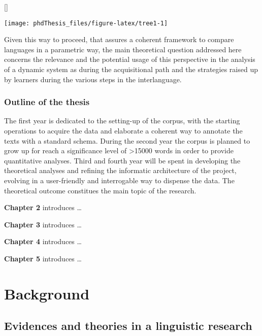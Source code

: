 \documentclass[
  a4paper,
  twoside,
  12pt,
  chapterprefix=false,
  bibliography=totocnumbered,
  listof=flat]{scrbook}
\makeatletter
\renewenvironment{figure}[1][\fps@figure]{
  \edef\@tempa{\noexpand\@float{figure}[#1]} 
  \@tempa
  \sffamily
}{
  \end@float
}
\makeatother
\begin{document}
\begin{figure}

{\centering \texttt{[image: phdThesis\_files/figure-latex/tree1-1]} 

}

\caption{Structural representation of a simple sentence}\label{fig:tree1}
\end{figure}

Given this way to proceed, that assures a coherent framework to compare languages in a parametric way, the main theoretical question addressed here concerns the relevance and the potential usage of this perspective in the analysis of a dynamic system as during the acquisitional path and the strategies raised up by learners during the various steps in the interlanguage.

\hypertarget{outline-of-the-thesis}{%
\section{Outline of the thesis}\label{outline-of-the-thesis}}

The first year is dedicated to the setting-up of the corpus, with the starting operations to acquire the data and elaborate a coherent way to annotate the texts with a standard schema. During the second year the corpus is planned to grow up for reach a significance level of \textgreater15000 words in order to provide quantitative analyses.
Third and fourth year will be spent in developing the theoretical analyses and refining the informatic architecture of the project, evolving in a user-friendly and interrogable way to dispense the data. The theoretical outcome constitues the main topic of the research.

\textbf{Chapter 2} introduces \ldots{}

\textbf{Chapter 3} introduces \ldots{}

\textbf{Chapter 4} introduces \ldots{}

\textbf{Chapter 5} introduces \ldots{}

\part{Background}\label{part-bg}

\hypertarget{evidences-and-theories-in-a-linguistic-research}{%
\chapter{Evidences and theories in a linguistic research}\label{evidences-and-theories-in-a-linguistic-research}}
\end{document}
